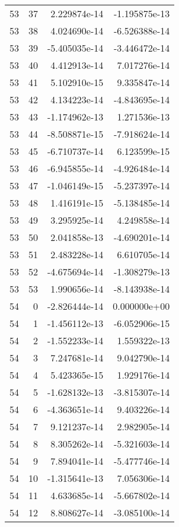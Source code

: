 \begin{tabular}{rrrr}
  53 &   37 &  2.229874e-14 & -1.195875e-13 \\
  53 &   38 &  4.024690e-14 & -6.526388e-14 \\
  53 &   39 & -5.405035e-14 & -3.446472e-14 \\
  53 &   40 &  4.412913e-14 &  7.017276e-14 \\
  53 &   41 &  5.102910e-15 &  9.335847e-14 \\
  53 &   42 &  4.134223e-14 & -4.843695e-14 \\
  53 &   43 & -1.174962e-13 &  1.271536e-13 \\
  53 &   44 & -8.508871e-15 & -7.918624e-14 \\
  53 &   45 & -6.710737e-14 &  6.123599e-15 \\
  53 &   46 & -6.945855e-14 & -4.926484e-14 \\
  53 &   47 & -1.046149e-15 & -5.237397e-14 \\
  53 &   48 &  1.416191e-15 & -5.138485e-14 \\
  53 &   49 &  3.295925e-14 &  4.249858e-14 \\
  53 &   50 &  2.041858e-13 & -4.690201e-14 \\
  53 &   51 &  2.483228e-14 &  6.610705e-14 \\
  53 &   52 & -4.675694e-14 & -1.308279e-13 \\
  53 &   53 &  1.990656e-14 & -8.143938e-14 \\
  54 &    0 & -2.826444e-14 &  0.000000e+00 \\
  54 &    1 & -1.456112e-13 & -6.052906e-15 \\
  54 &    2 & -1.552233e-14 &  1.559322e-13 \\
  54 &    3 &  7.247681e-14 &  9.042790e-14 \\
  54 &    4 &  5.423365e-15 &  1.929176e-14 \\
  54 &    5 & -1.628132e-13 & -3.815307e-14 \\
  54 &    6 & -4.363651e-14 &  9.403226e-14 \\
  54 &    7 &  9.121237e-14 &  2.982905e-14 \\
  54 &    8 &  8.305262e-14 & -5.321603e-14 \\
  54 &    9 &  7.894041e-14 & -5.477746e-14 \\
  54 &   10 & -1.315641e-13 &  7.056306e-14 \\
  54 &   11 &  4.633685e-14 & -5.667802e-14 \\
  54 &   12 &  8.808627e-14 & -3.085100e-14 \\

\end{tabular}
